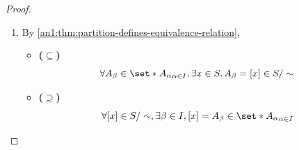 \begin{proof}
\begin{enumerate}[label=\textbf{(\Alph*)}]
          \begin{itemize}
            \item \textbf{($\subseteq$)} Suppose $y \in [x]$. Then
                  \[
                    \begin{array}{c}
                      \exists \gamma \in I, y \in A_{\gamma} \land x \in A_{\gamma} \\
                      \Downarrow                                                    \\
                      x \in A_{\gamma} \cap A_{\beta}                               \\
                      \Downarrow                                                    \\
                      \gamma = \beta                                                \\
                      \Downarrow                                                    \\
                      y \in A_{\beta}
                    \end{array}
                  \]
            \item \textbf{($\supseteq$)} Suppose $y \in A_{\beta}$. Then
                  \[
                    \begin{array}{c}
                      y \sim x   \\
                      \Downarrow \\
                      y \in [x]
                    \end{array}
                  \]
          \end{itemize}
    \item By \cref{an1:thm:partition-defines-equivalence-relation},
          \begin{itemize}
            \item \textbf{($\subseteq$)}
                  \[
                    \forall A_{\beta} \in \set*{A_{\alpha}}_{\alpha \in I},
                    \exists x \in S, A_{\beta} = [x] \in S / \sim
                  \]
            \item \textbf{($\supseteq$)}
                  \[
                    \forall [x] \in S / \sim, \exists \beta \in I, [x] = A_{\beta} \in \set*{A_{\alpha}}_{\alpha \in I}
                  \]
          \end{itemize}
  \end{enumerate}
\end{proof}
